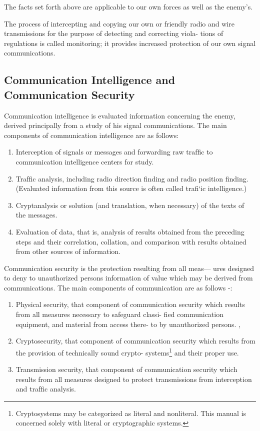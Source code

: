 \mypara The facts set forth above are applicable to our own forces as well
as the enemy’s.

\mypara The process of intercepting and copying our own or friendly radio
and wire transmissions for the purpose of detecting and correcting viola-
tions of regulations is called monitoring; it provides increased protection
of our own signal communications.

\subsection{Communication Intelligence and Communication Security}

\mypara Communication intelligence is evaluated information concerning the
enemy, derived principally from a study of his signal communications.
The main components of communication intelligence are as follows:

\begin{enumerate}
\item Interception of signals or messages and forwarding raw trafﬁc
to communication intelligence centers for study.

\item Trafﬁc analysis, including radio direction ﬁnding and radio
position ﬁnding. (Evaluated information from this source is
often called traﬁ‘ic intelligence.)

\item Cryptanalysis or solution (and translation, when necessary) of
the texts of the messages.

\item Evaluation of data, that is, analysis of results obtained from the
preceding steps and their correlation, collation, and comparison
with results obtained from other sources of information.
\end{enumerate}

\mypara Communication security is the protection resulting from all meas—
ures designed to deny to unauthorized persons information of value
which may be derived from communications. The main components of
communication are as follows -:

\begin{enumerate}
\item Physical security, that component of communication security
which results from all measures necessary to safeguard classi-
ﬁed communication equipment, and material from access there-
to by unauthorized persons. ,

\item Cryptosecurity, that component of communication security
which results from the provision of technically sound crypto-
systems\footnote{ Cryptosystems may be categorized as literal and nonliteral. This manual is concerned solely with literal or cryptographic systems.  } and their proper use.

\item Transmission security, that component of communication
security which results from all measures designed to protect
transmissions from interception and trafﬁc analysis.
\end{enumerate}

